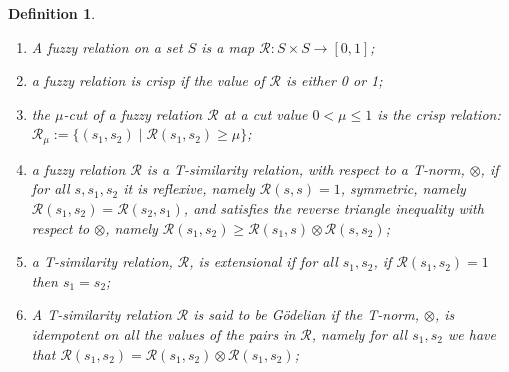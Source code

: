 \documentclass{article}
\newcommand{\cR}{{\mathcal R}}
\def\cut{\mu}
\newtheorem{definition}{Definition}[section]
\begin{document}
\begin{definition}\hfill \begin{enumerate}
\item A {\em fuzzy relation} on a
set $S$ is a map $\cR:S\times S\to[0,1]$;
\item a fuzzy relation is {\em crisp} if the value of $\cR$ is either 0 or 1;
\item the \emph{$\cut$-cut} of a fuzzy relation $\cR$ at a \emph{cut value}
$0<\cut\le 1$ is the crisp relation:
$\cR_\cut := \{(s_1,s_2) \mid \cR(s_1,s_2) \ge \cut \}$;
\item a fuzzy relation $\cR$ is a \emph{T-similarity relation}, with respect to a T-norm, $\otimes$, if for all $s,s_1,s_2$ it is {\em reflexive}, namely $\cR(s,s)=1$, {\em symmetric}, namely $\cR(s_1,s_2)=\cR(s_2,s_1)$, and satisfies the {\em reverse
triangle inequality} with respect to $\otimes$, namely $\cR(s_1,s_2)\ge \cR(s_1,s) \otimes \cR(s,s_2)$;
\item a T-similarity relation, $\cR$, is {\em extensional} if for all $s_1,s_2$, if $\cR(s_1,s_2)=1$ then $s_1=s_2$;
\item A T-similarity relation $\cR$ is said to be {\em G\"odelian} if the T-norm, $\otimes$, is idempotent on all the values of the pairs in $\cR$, namely for all $s_1,s_2$ we have that $\cR(s_1,s_2)= \cR(s_1,s_2) \otimes \cR(s_1,s_2)$;
\end{enumerate}
\end{definition} 
\end{document}
